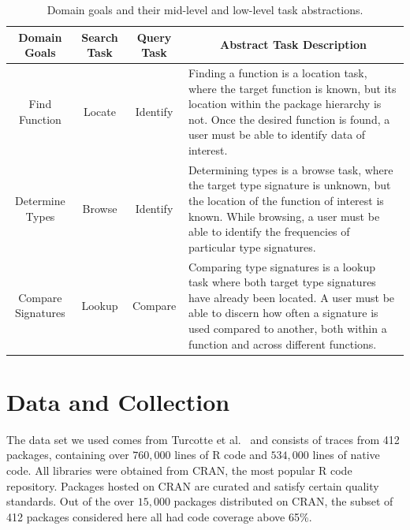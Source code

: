 \documentclass{vgtc}                          %
\begin{document}
\bgroup
\def\arraystretch{1.75}
\begin{table}
  \centering
  \begin{tabularx}{\linewidth}{c|c|c|X}
    Domain Goals & Search Task & Query Task & \multicolumn{1}{c}{Abstract Task Description} \\
    \hline
    Find Function & Locate & Identify & Finding a function is a location task, where the target function is known, but its location within the package hierarchy is not. Once the desired function is found, a user must be able to identify data of interest. \\

    Determine Types & Browse & Identify & Determining types is a browse task, where the target type signature is unknown, but the location of the function of interest is known. While browsing, a user must be able to identify the frequencies of particular type signatures.\\

    Compare Signatures & Lookup & Compare & Comparing type signatures is a lookup task where both target type signatures have already been located. A user must be able to discern how often a signature is used compared to another, both within a function and across different functions.\\
  \end{tabularx}
  \caption{Domain goals and their mid-level and low-level task abstractions.}
  \label{tab:tasks}
\end{table}
\egroup

\section{Data and Collection}

The data set we used comes from
Turcotte et al.~\cite{turcotte:2020}
and consists of traces from 412 packages,
containing over $760,000$ lines of R code
and $534,000$ lines of native code.
All libraries were obtained from CRAN,
the most popular R code repository.
Packages hosted on CRAN are curated and satisfy
certain quality standards.
Out of the over $15,000$ packages
distributed on CRAN,
the subset of 412 packages considered here
all had code coverage above 65\%.
\end{document}
